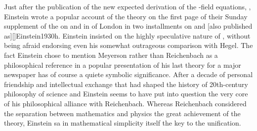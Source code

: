 \documentclass[draft]{article}
\newcommand{\FP}{\german{Fernparallelismus}\xspace}
\begin{document}
Just after the publication of the new expected derivation of the \FP-field equations, \citep{Einstein1929b}, Einstein wrote a popular account of the theory on the first page of their Sunday supplement of the  on  and in  of London in two installments on  and  [also published as][]{Einstein1930h}. Einstein insisted on the highly speculative nature of \uftp, without being afraid endorsing even his somewhat outrageous comparison with Hegel. The fact Einstein chose to mention Meyerson rather than Reichenbach as a philosophical reference in a popular presentation of his last theory for a major newspaper has of course a quiete symbolic significance. After a decade of personal friendship and intellectual exchange that had shaped the history of 20th-century philosophy of science and Einstein seems to have put into question the very core of his philosophical alliance with Reichenbach. Whereas Reichenbach considered the separation between mathematics and physics the great achievement of the theory, Einstein sa in mathematical simplicity itself the key to the unification.
\end{document}
